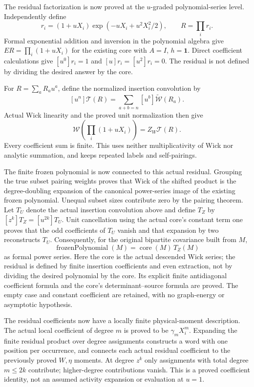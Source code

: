 \documentclass[11pt]{article}
\begin{document}
The residual factorization is now proved at the $u$-graded polynomial-series level. Independently define
\[
 r_i=(1+uX_i)\exp(-uX_i+u^2X_i^2/2),\qquad R=\prod_i r_i.
\]
Formal exponential addition and inversion in the polynomial algebra give $ER=\prod_i(1+uX_i)$ for the existing core with $A=I$, $h=\mathbf1$. Direct coefficient calculations give $[u^0]r_i=1$ and $[u]r_i=[u^2]r_i=0$. The residual is not defined by dividing the desired answer by the core.

For $R=\sum_aR_au^a$, define the normalized insertion convolution by
\[
 [u^n]\mathcal T(R)=\sum_{a+b=n}[u^b]\widetilde{\mathcal W}(R_a).
\]
Actual Wick linearity and the proved unit normalization then give
\[
 \mathcal W\!\left(\prod_i(1+uX_i)\right)=Z_W\mathcal T(R).
\]
Every coefficient sum is finite. This uses neither multiplicativity of Wick nor analytic summation, and keeps repeated labels and self-pairings.

The finite frozen polynomial is now connected to this actual residual. Grouping the true subset pairing weights proves that Wick of the shifted product is the degree-doubling expansion of the canonical power-series image of the existing frozen polynomial. Unequal subset sizes contribute zero by the pairing theorem. Let $T_U$ denote the actual insertion convolution above and define $T_Z$ by $[z^k]T_Z=[u^{2k}]T_U$. Unit cancellation using the actual core's constant term one proves that the odd coefficients of $T_U$ vanish and that expansion by two reconstructs $T_U$. Consequently, for the original bipartite covariance built from $M$,
\[
 \operatorname{frozenPolynomial}(M)=\operatorname{core}(M)\,T_Z(M)
\]
as formal power series. Here the core is the actual descended Wick series; the residual is defined by finite insertion coefficients and even extraction, not by dividing the desired polynomial by the core. Its explicit finite antidiagonal coefficient formula and the core's determinant–source formula are proved. The empty case and constant coefficient are retained, with no graph-energy or asymptotic hypothesis.

The residual coefficients now have a locally finite physical-moment description. The actual local coefficient of degree $m$ is proved to be $\gamma_mX_i^m$. Expanding the finite residual product over degree assignments constructs a word with one position per occurrence, and connects each actual residual coefficient to the previously proved $W,\eta$ moments. At degree $z^k$ only assignments with total degree $m\le2k$ contribute; higher-degree contributions vanish. This is a proved coefficient identity, not an assumed activity expansion or evaluation at $u=1$.
\end{document}
